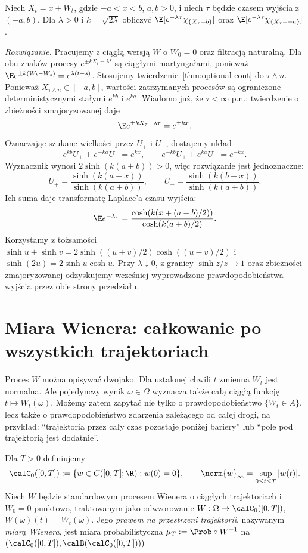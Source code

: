 \begin{zadanie}
Niech $X_t=x+W_t$, gdzie $-a<x<b$, $a,b>0$,
i niech $\tau$ będzie czasem wyjścia z $(-a,b)$.
Dla $\lambda>0$ i $k=\sqrt{2\lambda}$ obliczyć
$\E[e^{-\lambda\tau}\chi_{\{X_\tau=b\}}]$
oraz $\E[e^{-\lambda\tau}\chi_{\{X_\tau=-a\}}]$.

\emph{Rozwiązanie.} Pracujemy z ciągłą wersją
$W$ o $W_0=0$ oraz filtracją naturalną.
Dla obu znaków procesy
$e^{\pm kX_t-\lambda t}$ są ciągłymi martyngałami,
ponieważ $\E e^{\pm k(W_t-W_s)}=e^{\lambda(t-s)}$.
Stosujemy twierdzenie~\ref{thm:optional-cont}
do $\tau\wedge n$. Ponieważ $X_{\tau\wedge n}\in[-a,b]$,
wartości zatrzymanych procesów są ograniczone
deterministycznymi stałymi $e^{kb}$ i $e^{ka}$.
Wiadomo już, że $\tau<\infty$ p.n.; twierdzenie
o zbieżności zmajoryzowanej daje
\[
\E e^{\pm k X_\tau-\lambda\tau}=e^{\pm kx}.
\]
Oznaczając szukane wielkości przez $U_+$ i $U_-$,
dostajemy układ
\[
e^{kb}U_++e^{-ka}U_-=e^{kx},\qquad
e^{-kb}U_++e^{ka}U_-=e^{-kx}.
\]
Wyznacznik wynosi $2\sinh(k(a+b))>0$,
więc rozwiązanie jest jednoznaczne:
\[
U_+=\frac{\sinh(k(a+x))}{\sinh(k(a+b))},
\qquad
U_-=\frac{\sinh(k(b-x))}{\sinh(k(a+b))}.
\]
Ich suma daje transformatę Laplace'a czasu wyjścia:
\[
\E e^{-\lambda\tau}
=\frac{\cosh(k(x+(a-b)/2))}
{\cosh(k(a+b)/2)}.
\]
Korzystamy z tożsamości
$\sinh u+\sinh v=2\sinh((u+v)/2)\cosh((u-v)/2)$
i $\sinh(2u)=2\sinh u\cosh u$.
Przy $\lambda\downarrow0$, z granicy
$\sinh z/z\to1$ oraz zbieżności zmajoryzowanej
odzyskujemy wcześniej wyprowadzone prawdopodobieństwa
wyjścia przez obie strony przedziału.
\end{zadanie}

\section{Miara Wienera: całkowanie po wszystkich trajektoriach}
Proces $W$ można opisywać dwojako. Dla ustalonej chwili $t$
zmienna $W_t$ jest normalna. Ale pojedynczy wynik
$\omega\in\Omega$ wyznacza także całą ciągłą funkcję
$t\mapsto W_t(\omega)$. Możemy zatem zapytać nie tylko
o prawdopodobieństwo $\{W_t\in A\}$, lecz także o
prawdopodobieństwo zdarzenia zależącego od całej drogi,
na przykład: ``trajektoria przez cały czas pozostaje
poniżej bariery'' lub ``pole pod trajektorią jest dodatnie''.

\begin{definicja}
Dla $T>0$ definiujemy
\[
\calC_0([0,T]):=\{w\in C([0,T];\R):w(0)=0\},
\qquad \norm{w}_\infty=\sup_{0\le t\le T}|w(t)|.
\]
Niech $W$ będzie standardowym procesem Wienera o ciągłych
trajektoriach i $W_0=0$ punktowo, traktowanym jako odwzorowanie
$W:\Omega\to\calC_0([0,T])$,
$W(\omega)(t)=W_t(\omega)$.
Jego \emph{prawem na przestrzeni trajektorii}, nazywanym
\emph{miarą Wienera}, jest miara probabilistyczna
$\mu_T:=\Prob\circ W^{-1}$ na
$(\calC_0([0,T]),\calB(\calC_0([0,T])))$.
\end{definicja}

